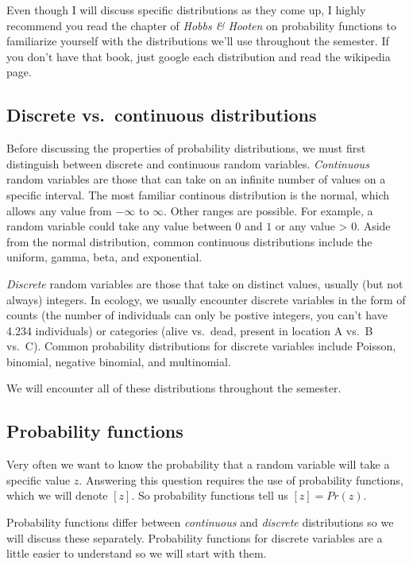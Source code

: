 \documentclass[]{article}
\begin{document}
Even though I will discuss specific distributions as they come up, I
highly recommend you read the chapter of \emph{Hobbs \& Hooten} on
probability functions to familiarize yourself with the distributions
we'll use throughout the semester. If you don't have that book, just
google each distribution and read the wikipedia page.

\hypertarget{discrete-vs.continuous-distributions}{%
\subsection{Discrete vs.~continuous
distributions}\label{discrete-vs.continuous-distributions}}

Before discussing the properties of probability distributions, we must
first distinguish between discrete and continuous random variables.
\emph{Continuous} random variables are those that can take on an
infinite number of values on a specific interval. The most familiar
continous distribution is the normal, which allows any value from
\(-\infty\) to \(\infty\). Other ranges are possible. For example, a
random variable could take any value between \(0\) and \(1\) or any
value \textgreater{} \(0\). Aside from the normal distribution, common
continuous distributions include the uniform, gamma, beta, and
exponential.

\emph{Discrete} random variables are those that take on distinct values,
usually (but not always) integers. In ecology, we usually encounter
discrete variables in the form of counts (the number of individuals can
only be postive integers, you can't have 4.234 individuals) or
categories (alive vs.~dead, present in location A vs.~B vs.~C). Common
probability distributions for discrete variables include Poisson,
binomial, negative binomial, and multinomial.

We will encounter all of these distributions throughout the semester.

\hypertarget{probability-functions}{%
\subsection{Probability functions}\label{probability-functions}}

Very often we want to know the probability that a random variable will
take a specific value \(z\). Answering this question requires the use of
probability functions, which we will denote \([z]\). So probability
functions tell us \([z]=Pr(z)\).

Probability functions differ between \emph{continuous} and
\emph{discrete} distributions so we will discuss these separately.
Probability functions for discrete variables are a little easier to
understand so we will start with them.
\end{document}
